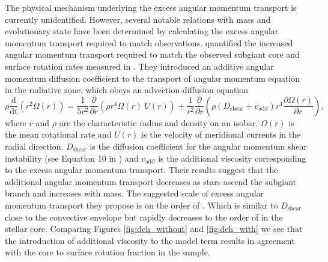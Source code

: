 The physical mechanism underlying the excess angular momentum transport is currently unidentified.
However, several notable relations with mass and evolutionary state have been determined by calculating the excess angular momentum transport required to match observations. 
\citet{spada_angular_2016} quantified the increased angular momentum transport required to match the observed subgiant core and surface rotation rates measured in \citet{deheuvels_seismic_2014}.
They introduced an additive angular momentum diffusion coefficient to the transport of angular momentum equation in the radiative zone, which obeys an advection-diffusion equation 
\begin{equation}
    \rho \frac{\text{d}}{\text{dt}}\left(r^2 \Omega \left( r \right)\right) = \frac{1}{5r^2}\frac{\partial}{\partial r}\left(\rho r^4 \Omega \left( r \right)
 \ U\left(r\right)\right) + \frac{1}{r^2}\frac{\partial}{\partial r} \left(\rho \left( D_{\text{shear}} + v_{\text{add}}\right) r^4 \frac{\partial \Omega\left( r \right)}{\partial r}\right),
\end{equation}
where $r$ and $\rho$ are the characteristic radius and density on an isobar. $\Omega(r)$ is the mean rotational rate and $U(r)$ is the velocity of meridional currents in the radial direction. $D_{\text{shear}}$ is the diffusion coefficient for the angular momentum shear instability (see Equation 10 in \citet{eggenberger_effects_2010}) and $v_{\text{add}}$ is the additional viscosity corresponding to the excess angular momentum transport.
Their results suggest that the additional angular momentum transport decreases as stars ascend the subgiant branch and increases with mass.
The suggested scale of excess angular momentum transport they propose is on the order of .
Which is similar to $D_{\text{shear}}$ close to the convective envelope but rapidly decreases to the order of  in the stellar core.
Comparing Figures \ref{fig:deh_without} and \ref{fig:deh_with} we see that the introduction of additional viscosity to the model term results in agreement with the core to surface rotation fraction in the \citet{deheuvels_seismic_2014} sample.

